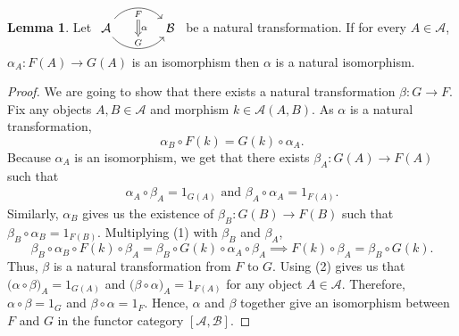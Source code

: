 \documentclass[18pt,a4paper]{article}
\theoremstyle{definition}
\newtheorem{lemma}[theorem]{Lemma}
\begin{document}
	\begin{lemma}
		Let $ 	\begin{tikzcd}[row sep=small, column sep=large]
		\mathcal{A}  \arrow[r,bend left=50, "F"{name=U, below}]
		\arrow[r, bend right = 50, "G"{name=D, above}]
		& \mathcal{B}
		\arrow[Rightarrow, from=U , to=D, "\alpha"]
			\end{tikzcd}$
			be a natural transformation. If for every $A \in \mathcal{A} $,
			 $\alpha_A:F(A) \to G(A)$ is an isomorphism
			then $\alpha$ is a natural isomorphism.
	\end{lemma}
	\begin{proof}\setcounter{equation}{0}
		We are going to show that there exists a natural transformation $\beta:G \to F$.
		Fix any objects $A,B\in \mathcal{A} $ and morphism $k \in \mathcal{A}(A,B)$. As
		$\alpha$ is a natural transformation,
		\begin{equation}
			\alpha_B \circ F(k) = G(k) \circ \alpha_A.
		\end{equation}
		Because $\alpha_A$ is an isomorphism, we get that
			there exists
			$\beta_A:G(A)\to F(A)$ such that
		\begin{align}
			\alpha_A \circ \beta_A = 1_{G(A)} \text{ and }
			\beta_A \circ \alpha_A = 1_{F(A)}.
		\end{align}
		Similarly, $\alpha_B$ gives us the existence of $\beta_B:G(B)\to F(B)$
		such that $\beta_B \circ \alpha_B = 1_{F(B)}$. Multiplying (1) with $\beta_B$ and
		$\beta_A$,
		\begin{equation}
			\beta_B^{} \circ \alpha_B^{} \circ F(k) \circ \beta_A^{} =
			\beta_B^{} \circ G(k) \circ \alpha_A^{} \circ \beta_A^{}
			\implies  F(k) \circ \beta_A^{} =\beta_B^{} \circ G(k).
		\end{equation}
		Thus, $\beta$ is a natural transformation from $F$ to $G$. Using (2) gives us
		that $\big( \alpha \circ \beta \big)_A = 1_{G(A)}$ and
		$\big( \beta \circ \alpha \big)_A = 1_{F(A)}$ for any object $A\in \mathcal{A} $.
		Therefore,$\alpha \circ \beta = 1_G$ and $\beta \circ \alpha =1_F$.
		Hence, $\alpha$ and $\beta$ together give an isomorphism between $F$ and $G$
		in the functor category
		$[\mathcal{A},\mathcal{B}]$.
	\end{proof}
\end{document}
